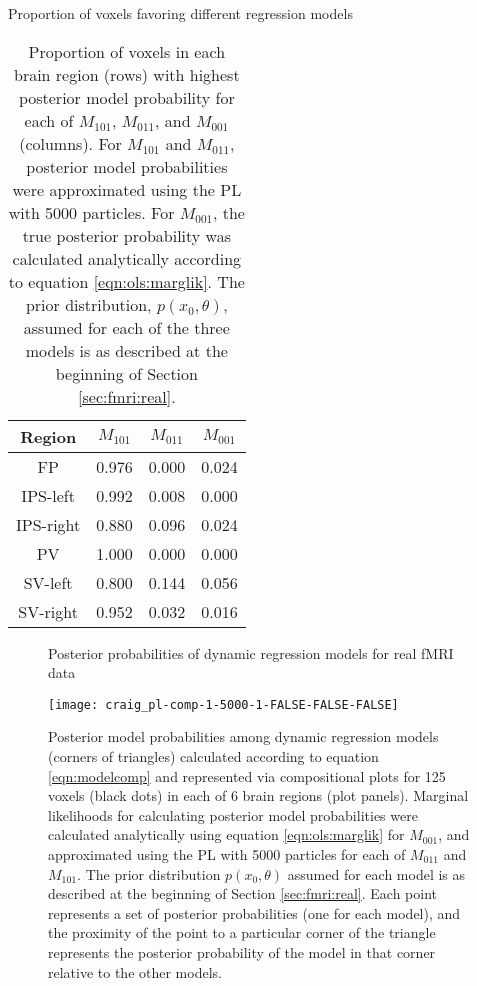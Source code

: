 
\begin{table}
\ssp
\centering
\caption{Proportion of voxels favoring different regression models} \label{tab:fmri:favor}
\begin{tabular}{|c|ccc|}
\hline
Region & $M_{101}$ & $M_{011}$ & $M_{001}$ \\
\hline
FP & 0.976 & 0.000 & 0.024 \\
IPS-left & 0.992 & 0.008 & 0.000 \\
IPS-right & 0.880 & 0.096 & 0.024 \\
PV & 1.000 & 0.000 & 0.000 \\
SV-left & 0.800 & 0.144 & 0.056 \\
SV-right & 0.952 & 0.032 & 0.016 \\
\hline
\end{tabular}
\caption*{Proportion of voxels in each brain region (rows) with highest posterior model probability for each of $M_{101}$, $M_{011}$, and $M_{001}$ (columns). For $M_{101}$ and $M_{011}$, posterior model probabilities were approximated using the PL with 5000 particles. For $M_{001}$, the true posterior probability was calculated analytically according to equation \eqref{eqn:ols:marglik}. The prior distribution, $p(x_0,\theta)$, assumed for each of the three models is as described at the beginning of Section \ref{sec:fmri:real}.}
\end{table}

\begin{figure}
\ssp
\centering
\caption{Posterior probabilities of dynamic regression models for real fMRI data} \label{fig:fmri:comp:real}
\texttt{[image: craig\_pl-comp-1-5000-1-FALSE-FALSE-FALSE]}
\caption*{Posterior model probabilities among dynamic regression models (corners of triangles) calculated according to equation \eqref{eqn:modelcomp} and represented via compositional plots for 125 voxels (black dots) in each of 6 brain regions (plot panels). Marginal likelihoods for calculating posterior model probabilities were calculated analytically using equation \eqref{eqn:ols:marglik} for $M_{001}$, and approximated using the PL with 5000 particles for each of $M_{011}$ and $M_{101}$. The prior distribution $p(x_0,\theta)$ assumed for each model is as described at the beginning of Section \ref{sec:fmri:real}. Each point represents a set of posterior probabilities (one for each model), and the proximity of the point to a particular corner of the triangle represents the posterior probability of the model in that corner relative to the other models.}
\end{figure}


